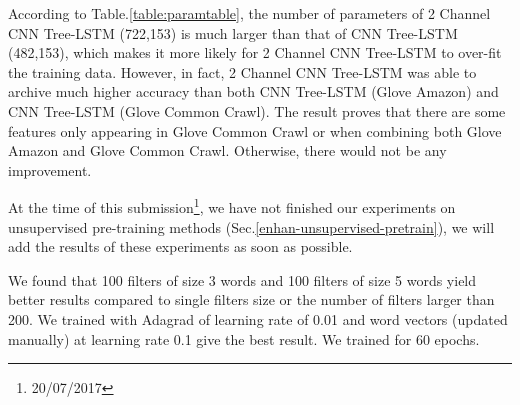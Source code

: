 According to Table.\ref{table:paramtable}, the number of parameters of 2 Channel CNN Tree-LSTM (722,153) is much larger than that of CNN Tree-LSTM (482,153), which makes it more likely for 2 Channel CNN Tree-LSTM to over-fit the training data.
However, in fact, 2 Channel CNN Tree-LSTM was able to archive much higher accuracy than both CNN Tree-LSTM (Glove Amazon) and CNN Tree-LSTM (Glove Common Crawl).\label{proved:Common-syn-Amazon}
The result proves that there are some features only appearing in Glove Common Crawl or when combining both Glove Amazon and Glove Common Crawl.
Otherwise, there would not be any improvement.

At the time of this submission\footnote{20/07/2017}, we have not finished our experiments on unsupervised pre-training methods (Sec.\ref{enhan-unsupervised-pretrain}), we will add the results of these experiments as soon as possible.

We found that 100 filters of size 3 words and 100 filters of size 5 words yield better results compared to single filters size or the number of filters larger than 200. We trained with Adagrad of learning rate of 0.01 and word vectors (updated manually) at learning rate 0.1 give the best result. We trained for 60 epochs.
